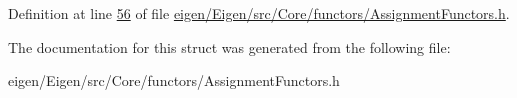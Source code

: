 Definition at line \hyperlink{eigen_2_eigen_2src_2_core_2functors_2_assignment_functors_8h_source_l00056}{56} of file \hyperlink{eigen_2_eigen_2src_2_core_2functors_2_assignment_functors_8h_source}{eigen/\+Eigen/src/\+Core/functors/\+Assignment\+Functors.\+h}.



The documentation for this struct was generated from the following file\+:\begin{DoxyCompactItemize}
\item 
eigen/\+Eigen/src/\+Core/functors/\+Assignment\+Functors.\+h\end{DoxyCompactItemize}
